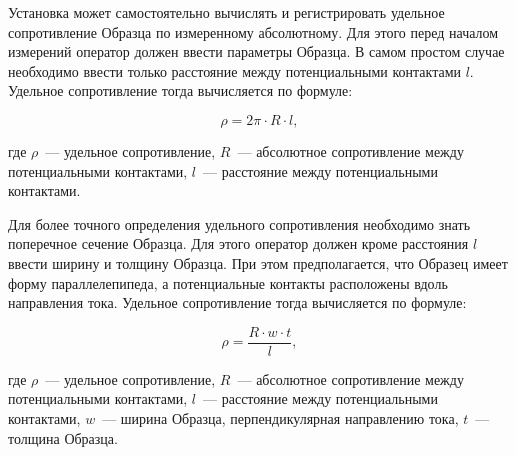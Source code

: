 Установка может самостоятельно вычислять и регистрировать удельное сопротивление Образца по измеренному абсолютному. Для этого перед началом измерений оператор должен ввести параметры Образца. В самом простом случае необходимо ввести только расстояние между потенциальными контактами $l$. Удельное сопротивление тогда вычисляется по формуле:

\begin{equation}
\rho = 2 \pi \cdot R \cdot l,
\end{equation}

\noindent где $\rho$~--- удельное сопротивление, $R$~--- абсолютное сопротивление между потенциальными контактами, $l$~--- расстояние между потенциальными контактами.

Для более точного определения удельного сопротивления необходимо знать поперечное сечение Образца. Для этого оператор должен кроме расстояния $l$ ввести ширину и толщину Образца. При этом предполагается, что Образец имеет форму параллелепипеда, а потенциальные контакты расположены вдоль направления тока. Удельное сопротивление тогда вычисляется по формуле:

\begin{equation}
\rho = \frac{R \cdot w \cdot t}{l},
\end{equation}

\noindent где $\rho$~--- удельное сопротивление, $R$~--- абсолютное сопротивление между потенциальными контактами, $l$~--- расстояние между потенциальными контактами, $w$~--- ширина Образца, перпендикулярная направлению тока, $t$~--- толщина Образца.
